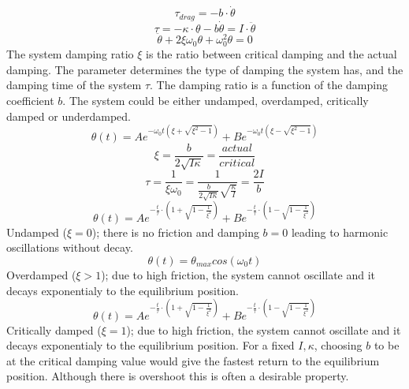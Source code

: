 \documentclass[\main/master.tex]{subfiles}
\begin{document}
\begin{equation}
\tau_{drag} = -b\cdot\dot{\theta}   \label{eqn:friction_torque}
\end{equation} 
\begin{equation}
\tau = -\kappa\cdot\theta - b\dot{\theta}  = I\cdot\ddot{\theta}   \label{eqn:damped_motion_equation}
\end{equation} 
\begin{equation}
\ddot{\theta} + 2\xi\omega_0\dot{\theta} + \omega_0^2\theta = 0   \label{eqn:damped_motion_equation}
\end{equation}
\noindent
The system damping ratio $\xi$ is the ratio between critical damping and the actual damping. The parameter determines the type of damping the system has, and the damping time of the system $\tau$. The damping ratio is a function of the damping coefficient $b$. The system could be either undamped, overdamped, critically damped or underdamped.
\begin{equation}
\theta(t) = Ae^{-\omega_0 t(\xi+\sqrt{\xi^2-1})} + Be^{-\omega_0 t(\xi-\sqrt{\xi^2-1})}    \label{eqn:damped_motion_equation}
\end{equation} 
\begin{equation}
\xi = \frac{b}{2\sqrt{I\kappa}} = \frac{actual}{critical}  \label{eqn:damped_motion_equation}
\end{equation}
\begin{equation}
\tau = \frac{1}{\xi\omega_0} = \frac{1}{\frac{b}{2\sqrt{I\kappa}}\sqrt{\frac{\kappa}{I}} }= \frac{2I}{b}  \label{eqn:damping_time}
\end{equation}
\begin{equation}
\theta(t) = Ae^{-\frac{t}{\tau}\cdot(1+\sqrt{1-\frac{1}{\xi^2}})} + Be^{-\frac{t}{\tau}\cdot(1-\sqrt{1-\frac{1}{\xi^2}})}    \label{eqn:damped_motion_equation}
\end{equation}
Undamped ($\xi = 0$); there is no friction and damping $b = 0$ leading to harmonic oscillations without decay.
\begin{equation}
\theta(t) = \theta_{max}cos(\omega_0 t )    \label{eqn:undamped_motion_equation}
\end{equation}
Overdamped ($\xi > 1$); due to high friction, the system cannot oscillate and it decays exponentialy to the equilibrium position.
\begin{equation}
\theta(t) = Ae^{-\frac{t}{\tau}\cdot(1+\sqrt{1-\frac{1}{\xi^2}})} + Be^{-\frac{t}{\tau}\cdot(1-\sqrt{1-\frac{1}{\xi^2}})}    \label{eqn:overdamped_motion_equation}
\end{equation}
Critically damped ($\xi = 1$); due to high friction, the system cannot oscillate and it decays exponentialy to the equilibrium position. For a fixed $I, \kappa$, choosing $b$ to be at the critical damping value would give the fastest return to the equilibrium position. Although there is overshoot this is often a desirable property.
\end{document}
